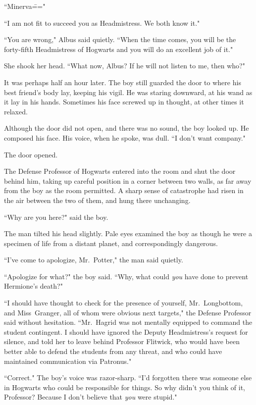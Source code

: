 ``Minerva\==="

``I am not fit to succeed you as Headmistress. We both know it."

``You are wrong," Albus said quietly. ``When the time comes, you will be the forty-fifth Headmistress of Hogwarts and you will do an excellent job of it."

She shook her head. ``What now, Albus? If he will not listen to me, then who?"

\later

It was perhaps half an hour later. The boy still guarded the door to where his best friend's body lay, keeping his vigil. He was staring downward, at his wand as it lay in his hands. Sometimes his face screwed up in thought, at other times it relaxed.

Although the door did not open, and there was no sound, the boy looked up. He composed his face. His voice, when he spoke, was dull. ``I don't want company."

The door opened.

The Defense Professor of Hogwarts entered into the room and shut the door behind him, taking up careful position in a corner between two walls, as far away from the boy as the room permitted. A sharp sense of catastrophe had risen in the air between the two of them, and hung there unchanging.

``Why are you here?" said the boy.

The man tilted his head slightly. Pale eyes examined the boy as though he were a specimen of life from a distant planet, and correspondingly dangerous.

``I've come to apologize, Mr.~Potter," the man said quietly.

``Apologize for what?" the boy said. ``Why, what could \emph{you} have done to prevent Hermione's death?"

``I should have thought to check for the presence of yourself, Mr.~Longbottom, and Miss~Granger, all of whom were obvious next targets," the Defense Professor said without hesitation. ``Mr.~Hagrid was not mentally equipped to command the student contingent. I should have ignored the Deputy Headmistress's request for silence, and told her to leave behind Professor Flitwick, who would have been better able to defend the students from any threat, and who could have maintained communication via Patronus."

``Correct." The boy's voice was razor-sharp. ``I'd forgotten there was someone else in Hogwarts who could be responsible for things. So why didn't you think of it, Professor? Because I don't believe that \emph{you} were stupid."

